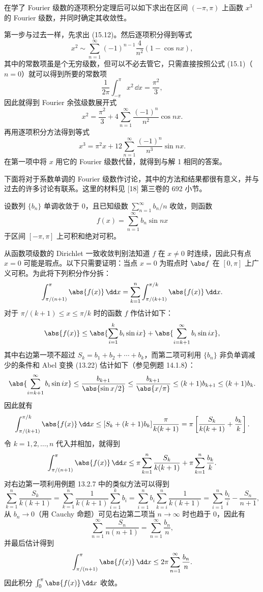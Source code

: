 \begin{xexample}[15.1.2 之解 3]
在学了 Fourier 级数的逐项积分定理后可以如下求出在区间 $(-\pi,\pi)$ 上函数 $x^3$ 的 Fourier 级数，并同时确定其收敛性。
\end{xexample}
\begin{xsolution}
第一步与过去一样，先求出 (15.12)。然后逐项积分得到等式
\[
  x^2\sim\sum_{n=1}^{\infty}(-1)^{n-1}\frac4{n^2}(1-\cos nx),
\]
其中的常数项虽是个无穷级数，但可以不必去管它，只需直接按照公式 (15.1)（$n=0$）就可以得到所要的常数项
\[
  \frac1{2\pi}\int_{-\pi}^{\pi}x^2\,\dd x=\frac{\pi^2}{3},
\]
因此就得到 Fourier 余弦级数展开式
\[
  x^2=\frac{\pi^2}{3}+4\sum_{n=1}^{\infty}\frac{(-1)^n}{n^2}\cos nx.
\]
再用逐项积分方法得到等式
\[
  x^3=\pi^2x+12\sum_{n=1}^{\infty}\frac{(-1)^n}{n^3}\sin nx.
\]
在第一项中将 $x$ 用它的 Fourier 级数代替，就得到与解 1 相同的答案。
\end{xsolution}

下面将对于系数单调的 Fourier 级数作讨论，其中的方法和结果都很有意义，并与过去的许多讨论有联系。这里的材料见 [18] 第三卷的 692 小节。

\begin{xexample}[15.2.3]
设数列 $\{b_n\}$ 单调收敛于 0，且已知级数 $\sum_{n=1}^{\infty}b_n/n$ 收敛，则函数
\[
  f(x)=\sum_{n=1}^{\infty}b_n\sin nx
\]
于区间 $[-\pi,\pi]$ 上可积和绝对可积。
\end{xexample}
\begin{xproof}
从函数项级数的 Dirichlet 一致收敛判别法知道 $f$ 在 $x\ne0$ 时连续，因此只有点 $x=0$ 可能是瑕点。以下只需要证明：当点 $x=0$ 为瑕点时 $\abs f$ 在 $[0,\pi]$ 上广义可积。为此将下列积分作分拆：
\[
  \int_{\pi/(n+1)}^{\pi}\abs{f(x)}\,\dd x
  =\sum_{k=1}^{n}\int_{\pi/(k+1)}^{\pi/k}\abs{f(x)}\,\dd x.
\]
对于 $\pi/(k+1)\le x\le\pi/k$ 时的函数 $f$ 作估计如下：
\[
  \abs{f(x)}\le\abs{\sum_{i=1}^{k}b_i\sin ix}+\abs{\sum_{i=k+1}^{\infty}b_i\sin ix},
\]
其中右边第一项不超过 $S_k=b_1+b_2+\cdots+b_k$，而第二项可利用 $\{b_n\}$ 非负单调减少的条件和 Abel 变换 (13.22) 估计如下（参见例题 14.1.8）：
\[
  \abs{\sum_{i=k+1}^{\infty}b_i\sin ix}
  \le\frac{b_{k+1}}{\abs{\sin x/2}}
  \le\frac{b_{k+1}}{\abs{x/\pi}}
  \le(k+1)b_{k+1}\le(k+1)b_k.
\]
因此就有
\[
  \int_{\pi/(k+1)}^{\pi/k}\abs{f(x)}\,\dd x
  \le[S_k+(k+1)b_k]\frac{\pi}{k(k+1)}
  =\pi\left[\frac{S_k}{k(k+1)}+\frac{b_k}{k}\right].
\]
令 $k=1,2,\ldots,n$ 代入并相加，就得到
\[
  \int_{\pi/(n+1)}^{\pi}\abs{f(x)}\,\dd x
  \le\pi\sum_{k=1}^{n}\frac{S_k}{k(k+1)}+\pi\sum_{k=1}^{n}\frac{b_k}{k}.
\]
对右边第一项利用例题 13.2.7 中的类似方法可以得到
\[
  \sum_{k=1}^{n}\frac{S_k}{k(k+1)}
  =\sum_{k=1}^{n}\frac1{k(k+1)}\sum_{i=1}^{k}b_i
  =\sum_{i=1}^{n}b_i\sum_{k=i}^{n}\frac1{k(k+1)}
  =\sum_{i=1}^{n}\frac{b_i}{i}-\frac{S_n}{n+1},
\]
从 $b_n\to0$（用 Cauchy 命题）可见右边第二项当 $n\to\infty$ 时也趋于 0，因此有
\[
  \sum_{n=1}^{\infty}\frac{S_n}{n(n+1)}=\sum_{n=1}^{\infty}\frac{b_n}{n},
\]
并最后估计得到
\[
  \int_{\pi/(n+1)}^{\pi}\abs{f(x)}\,\dd x\le2\pi\sum_{n=1}^{\infty}\frac{b_n}{n}.
\]
因此积分 $\int_0^{\pi}\abs{f(x)}\,\dd x$ 收敛。
\end{xproof}

